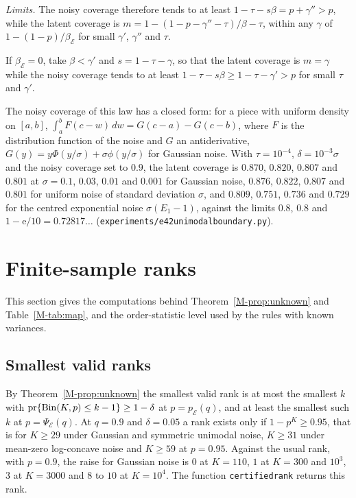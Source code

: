 \documentclass[11pt]{article}
\renewcommand{\_}{\usc\allowbreak}
\newcommand{\pr}{\mathrm{pr}}
\begin{document}
\emph{Limits.} The noisy coverage therefore tends to at least $1 - \tau - s\beta = p + \gamma'' > p$, while the latent coverage is $m = 1 - (1 - p - \gamma'' - \tau)/\beta - \tau$, within any $\gamma$ of $1 - (1 - p)/\beta_{\mathcal E}$ for small $\gamma'$, $\gamma''$ and $\tau$.

If $\beta_{\mathcal E} = 0$, take $\beta < \gamma'$ and $s = 1 - \tau - \gamma$, so that the latent coverage is $m = \gamma$ while the noisy coverage tends to at least $1 - \tau - s\beta \ge 1 - \tau - \gamma' > p$ for small $\tau$ and $\gamma'$.

The noisy coverage of this law has a closed form: for a piece with uniform density on $[a, b]$, $\int_a^b F(c - w)\,dw = G(c - a) - G(c - b)$, where $F$ is the distribution function of the noise and $G$ an antiderivative, $G(y) = y\Phi(y/\sigma) + \sigma\phi(y/\sigma)$ for Gaussian noise. With $\tau = 10^{-4}$, $\delta = 10^{-3}\sigma$ and the noisy coverage set to $0.9$, the latent coverage is $0.870$, $0.820$, $0.807$ and $0.801$ at $\sigma = 0.1$, $0.03$, $0.01$ and $0.001$ for Gaussian noise, $0.876$, $0.822$, $0.807$ and $0.801$ for uniform noise of standard deviation $\sigma$, and $0.809$, $0.751$, $0.736$ and $0.729$ for the centred exponential noise $\sigma(E_1 - 1)$, against the limits $0.8$, $0.8$ and $1 - \mathrm{e}/10 = 0.72817\ldots$ (\texttt{experiments/e42\_unimodal\_boundary.py}).

\section{Finite-sample ranks}\label{sec:s-ranks}

This section gives the computations behind Theorem~\ref{M-prop:unknown} and Table~\ref{M-tab:map}, and the order-statistic level used by the rules with known variances.

\subsection*{Smallest valid ranks}

By Theorem~\ref{M-prop:unknown} the smallest valid rank is at most the smallest $k$ with $\pr\{{\rm Bin}(K, p) \le k - 1\} \ge 1 - \delta$ at $p = p_{\mathcal E}(q)$, and at least the smallest such $k$ at $p = \Psi_{\mathcal E}(q)$. At $q = 0.9$ and $\delta = 0.05$ a rank exists only if $1 - p^K \ge 0.95$, that is for $K \ge 29$ under Gaussian and symmetric unimodal noise, $K \ge 31$ under mean-zero log-concave noise and $K \ge 59$ at $p = 0.95$. Against the usual rank, with $p = 0.9$, the raise for Gaussian noise is $0$ at $K = 110$, $1$ at $K = 300$ and $10^3$, $3$ at $K = 3000$ and $8$ to $10$ at $K = 10^4$. The function \texttt{certified\_rank} returns this rank.
\end{document}
